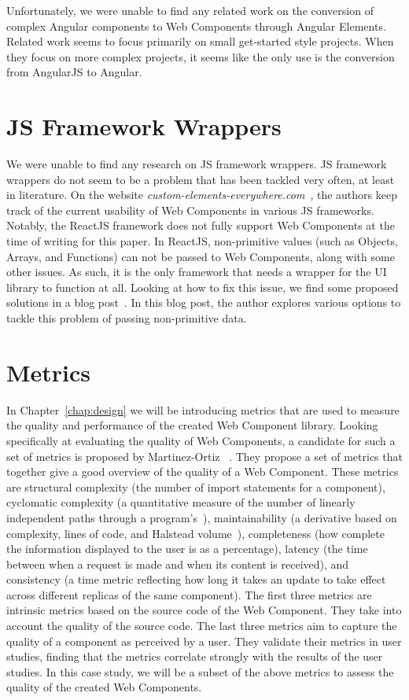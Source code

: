 Unfortunately, we were unable to find any related work on the conversion of complex Angular components to Web Components through Angular Elements. Related work seems to focus primarily on small get-started style projects. When they focus on more complex projects, it seems like the only use is the conversion from AngularJS to Angular.

\section{JS Framework Wrappers}
We were unable to find any research on JS framework wrappers. JS framework wrappers do not seem to be a problem that has been tackled very often, at least in literature. On the website \emph{custom-elements-everywhere.com}~, the authors keep track of the current usability of Web Components in various JS frameworks. Notably, the ReactJS framework does not fully support Web Components at the time of writing for this paper. In ReactJS, non-primitive values (such as Objects, Arrays, and Functions) can not be passed to Web Components, along with some other issues. As such, it is the only framework that needs a wrapper for the UI library to function at all. Looking at how to fix this issue, we find some proposed solutions in a blog post~. In this blog post, the author explores various options to tackle this problem of passing non-primitive data.

\section{Metrics}\label{sec:related-work:metrics}
In Chapter~\ref{chap:design} we will be introducing metrics that are used to measure the quality and performance of the created Web Component library. Looking specifically at evaluating the quality of Web Components, a candidate for such a set of metrics is proposed by Martinez-Ortiz \etal{}~\cite{martinez-ortiz2016quality}. They propose a set of metrics that together give a good overview of the quality of a Web Component. These metrics are structural complexity (the number of import statements for a component), cyclomatic complexity (a quantitative measure of the number of linearly independent paths through a program's~\cite{1702388}), maintainability (a derivative based on complexity, lines of code, and Halstead volume~\cite{halstead1977elements}), completeness (how complete the information displayed to the user is as a percentage), latency (the time between when a request is made and when its content is received), and consistency (a time metric reflecting how long it takes an update to take effect across different replicas of the same component). The first three metrics are intrinsic metrics based on the source code of the Web Component. They take into account the quality of the source code. The last three metrics aim to capture the quality of a component as perceived by a user. They validate their metrics in user studies, finding that the metrics correlate strongly with the results of the user studies.
In this case study, we will be a subset of the above metrics to assess the quality of the created Web Components.

